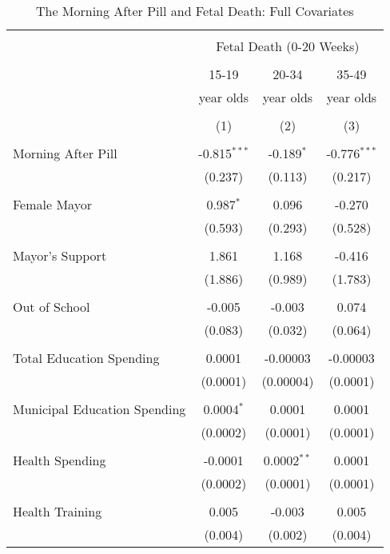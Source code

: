\begin{table}[htpb!] \centering 
  \caption{The Morning After Pill and Fetal Death: Full Covariates} 
  \label{TEENtabDeathFull} 
\begin{tabular}{@{\extracolsep{5pt}}lccc} 
\\[-1.8ex]\hline 
\hline \\[-1.8ex] 
 & \multicolumn{3}{c}{Fetal Death (0-20 Weeks)} \\ 
\cline{2-4} 
\\[-1.8ex] & 15-19 & 20-34 & 35-49 \\ 
 & year olds & year olds & year olds \\ 
\\[-1.8ex] & \multicolumn{1}{c}{(1)} & \multicolumn{1}{c}{(2)} & \multicolumn{1}{c}{(3)}\\ 
\hline \\[-1.8ex] 
 Morning After Pill & -0.815$^{***}$ & -0.189$^{*}$ & -0.776$^{***}$ \\ 
  & (0.237) & (0.113) & (0.217) \\ 
  & & & \\ 
  Female Mayor & 0.987$^{*}$ & 0.096 & -0.270 \\ 
  & (0.593) & (0.293) & (0.528) \\ 
  & & & \\ 
  Mayor's Support & 1.861 & 1.168 & -0.416 \\ 
  & (1.886) & (0.989) & (1.783) \\ 
  & & & \\ 
  Out of School & -0.005 & -0.003 & 0.074 \\ 
  & (0.083) & (0.032) & (0.064) \\ 
  & & & \\ 
  Total Education Spending & 0.0001 & -0.00003 & -0.00003 \\ 
  & (0.0001) & (0.00004) & (0.0001) \\ 
  & & & \\ 
  Municipal Education Spending & 0.0004$^{*}$ & 0.0001 & 0.0001 \\ 
  & (0.0002) & (0.0001) & (0.0001) \\ 
  & & & \\ 
  Health Spending & -0.0001 & 0.0002$^{**}$ & 0.0001 \\ 
  & (0.0002) & (0.0001) & (0.0001) \\ 
  & & & \\ 
  Health Training & 0.005 & -0.003 & 0.005 \\ 
  & (0.004) & (0.002) & (0.004) \\ 

\end{tabular}
\end{table}
